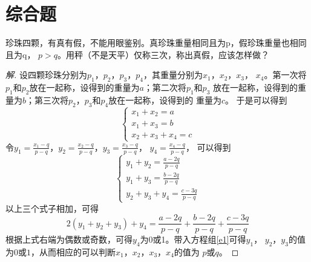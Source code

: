 \chapter{综合题}

\begin{Ex}
  珍珠四颗，有真有假，不能用眼鉴别。真珍珠重量相同且为p，假珍珠重量也相同且为q，
  $p > q$。用秤（不是天平）仅称三次，称出真假，应该怎样做？
\end{Ex}
\begin{proof}[解]
  设四颗珍珠分别为$p_1$，$p_2$，$p_3$，$p_4$，其重量分别为$x_1$，$x_2$，$x_3$，
  $x_4$。第一次将$p_1$和$p_2$放在一起称，设得到的重量为$a$；第二次将$p_1$和$p_3$
  放在一起称，设得到的重量为$b$；第三次将$p_2$，$p_3$和$p_4$放在一起称，设得到的
  重量为$c$。
  于是可以得到
  \begin{equation}
    \begin{cases}
      x_1 + x_2 = a\\
      x_1 + x_3 = b\\
      x_2 + x_3 + x_4 = c
    \end{cases}
  \end{equation}
  令$y_1=\frac{x_1-q}{p-q}$，$y_2=\frac{x_2-q}{p-q}$，$y_3=\frac{x_3-q}{p-q}$，
  $y_4=\frac{x_4-q}{p-q}$，
  可以得到
  \begin{equation}\label{e1}
    \begin{cases}
      y_1 + y_2 = \frac{a-2q}{p-q}\\
      y_1 + y_3 = \frac{b-2q}{p-q}\\
      y_2 + y_3 + y_4 = \frac{c-3q}{p-q}
    \end{cases}
  \end{equation}
  以上三个式子相加，可得
  \begin{equation}
    2(y_1 + y_2 + y_3) + y_4 = \frac{a-2q}{p-q} + \frac{b-2q}{p-q} + \frac{c-3q}{p-q}
  \end{equation}
  根据上式右端为偶数或奇数，可得$y_4$为$0$或1。带入方程组\eqref{e1}可得$y_1$，
  $y_2$，$y_3$的值为$0$或$1$，从而相应的可以判断$x_1$，$x_2$，$x_3$，$x_4$的值为
  $p$或$q$。
\end{proof}